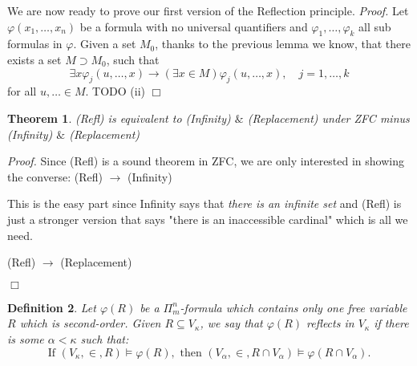 \documentclass[12pt,a4paper]{article}
\newtheorem{theorem}{Theorem}[section]
\newtheorem{definition}[theorem]{Definition}
\newenvironment{proof}
{\noindent \textit{Proof.}}
{\hspace*{\fill} $\Box$}
\newcommand{\sub}{\subseteq}
\newcommand{\then}{\rightarrow}
\begin{document}
\newline
\newline
We are now ready to prove our first version of the Reflection principle.
\begin{proof}
Let $\varphi(x_1,\ldots,x_n)$ be a formula with no universal quantifiers and $\varphi_1,\ldots,\varphi_k$ all sub formulas in $\varphi$. 
Given a set $M_0$, thanks to the previous lemma we know, that there exists a set $M \supset M_0$, such that
\begin{equation}
\exists x \varphi_j(u,\ldots,x) \to (\exists x \in M) \varphi_j (u,\ldots,x),\quad j = 1,\ldots,k
\end{equation}
for all $u,\ldots \in M$.
\newline\newline
TODO (ii)
\end{proof}

\medskip

\begin{theorem}
(Refl) is equivalent to (Infinity) $\&$ (Replacement) under ZFC minus (Infinity) $\&$ (Replacement)
\end{theorem}

\begin{proof}
Since (Refl) is a sound theorem in ZFC, we are only interested in showing the converse:
\medskip
(Refl) $\then$ (Infinity)

This is the easy part since Infinity says that \emph{there is an infinite set} and (Refl) is just a stronger version that says "there is an inaccessible cardinal" which is all we need.

\medskip

(Refl) $\then$ (Replacement)

\end{proof}


\begin{definition}\label{def:reflection_2}
Let $\varphi(R)$ be a $\Pi^n_m$-formula which contains only one free variable $R$ which is second-order. Given $R \sub V_\kappa$, we say that $\varphi(R)$ reflects in $V_\kappa$ if there is some $\alpha<\kappa$ such that:
\begin{equation}
\mbox{If }(V_\kappa,\in, R)\models \varphi(R), \mbox{ then }(V_\alpha,\in, R\cap V_\alpha) \models \varphi(R\cap V_\alpha).
\end{equation}
\end{definition}
\end{document}
